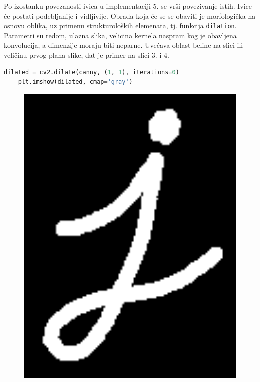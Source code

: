 \documentclass[fontsize=12bp, paper=a4]{scrarticle}
\begin{document}
Po izostanku povezanosti ivica u implementaciji 5. se vrši povezivanje istih. Ivice će postati podebljanije i vidljivije. Obrada koja će se se obaviti je morfologička na osnovu oblika, uz primenu strukturoloških elemenata, tj. funkcija \verb|dilation|\cite{dilation}. Parametri su redom, ulazna slika, velicina kernela naspram kog je obavljena konvolucija, a dimenzije moraju biti neparne. Uvećava oblast beline na slici ili veličinu prvog plana slike, dat je primer na slici 3. i 4.

\begin{lstlisting}[language=Python, caption=Povezivanja i podebljivanje ivica]
    dilated = cv2.dilate(canny, (1, 1), iterations=0) 
    plt.imshow(dilated, cmap='gray') 
\end{lstlisting}

\begin{figure}[tbp!]
    \centering
    \begin{minipage}[b]{0.25\textwidth}
        \includegraphics[width=1\textwidth]{3.png}

\end{minipage}
\end{figure}
\end{document}
